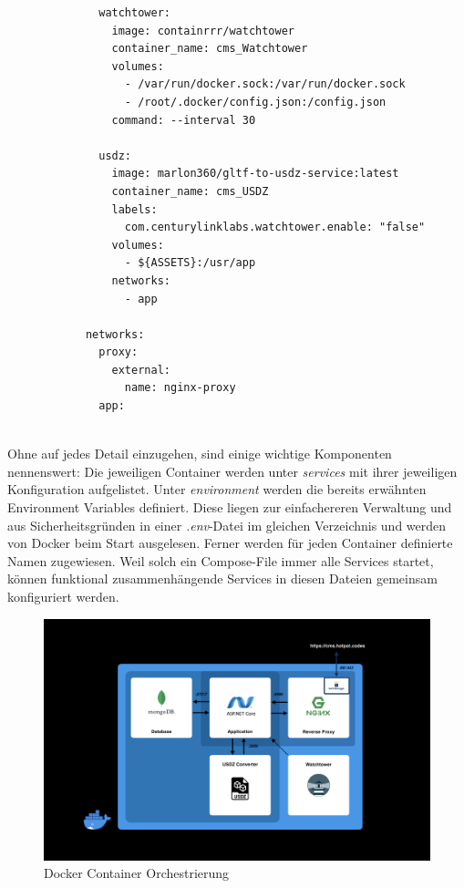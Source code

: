 \documentclass[titlepage, a4paper, 11pt]{scrartcl}
\begin{document}
\begin{lstlisting}
              watchtower:
                image: containrrr/watchtower
                container_name: cms_Watchtower
                volumes:
                  - /var/run/docker.sock:/var/run/docker.sock
                  - /root/.docker/config.json:/config.json
                command: --interval 30
                
              usdz:
                image: marlon360/gltf-to-usdz-service:latest
                container_name: cms_USDZ
                labels:
                  com.centurylinklabs.watchtower.enable: "false"
                volumes:
                  - ${ASSETS}:/usr/app
                networks:
                  - app
            
            networks:
              proxy:
                external:
                  name: nginx-proxy
              app:
            
          \end{lstlisting}

          Ohne auf jedes Detail einzugehen, sind einige wichtige Komponenten nennenswert: Die jeweiligen Container werden unter \textit{services} mit ihrer jeweiligen Konfiguration aufgelistet.
          Unter \textit{environment} werden die bereits erwähnten Environment Variables definiert. Diese liegen zur einfachereren Verwaltung und aus Sicherheitsgründen in einer \textit{.env}-Datei
          im gleichen Verzeichnis und werden von Docker beim Start ausgelesen. Ferner werden für jeden Container definierte Namen zugewiesen. Weil solch ein Compose-File immer alle Services startet,
          können funktional zusammenhängende Services in diesen Dateien gemeinsam konfiguriert werden.

          \begin{figure}[h]
            \centering
            \includegraphics[width=.6\textwidth]{DCompose.png}
            \caption{Docker Container Orchestrierung}
            \label{pipeline}
          \end{figure}
\end{document}
